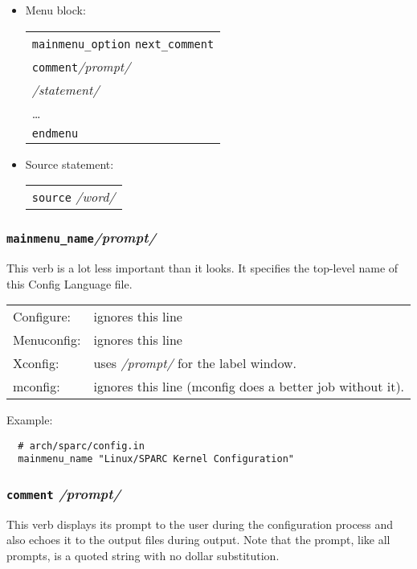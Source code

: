 \begin{itemize}
\item Menu block:

\begin{tabular}{l}
   \texttt{mainmenu\_option} \texttt{next\_comment}\\
   \texttt{comment}\quad \textit{/prompt/}\\
         \qquad\textit{/statement/}\\
         \qquad\dots\\
        \texttt{endmenu}\\
\end{tabular}

\item Source statement:

\begin{tabular}{l}
 \texttt{source} \textit{/word/}
\end{tabular}

\end{itemize}



\subsubsection{\texttt{mainmenu\_name}\quad \textit{/prompt/}}

This verb is a lot less important than it looks.  It specifies the top-level
name of this Config Language file.

\begin{tabular}{ll}
Configure:  &ignores this line\\
Menuconfig: &ignores this line\\
Xconfig:    &uses \textit{/prompt/} for the label window.\\
mconfig:    &ignores this line (mconfig does a better job without it).\\
\end{tabular}

Example:
{\small\begin{verbatim}
  # arch/sparc/config.in
  mainmenu_name "Linux/SPARC Kernel Configuration"
\end{verbatim}}


\subsubsection{\texttt{comment} \quad\textit{/prompt/}}

This verb displays its prompt to the user during the configuration process
and also echoes it to the output files during output.  Note that the
prompt, like all prompts, is a quoted string with no dollar substitution.

